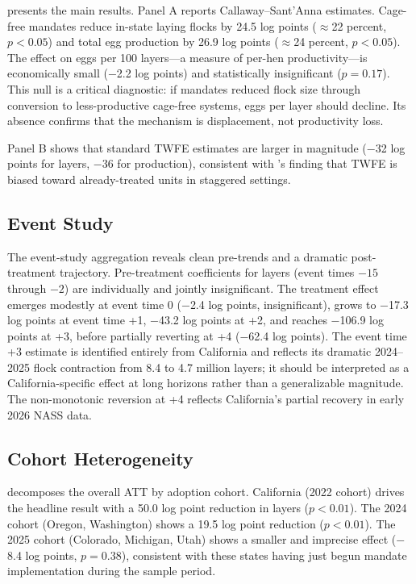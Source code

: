 \documentclass[12pt]{article}
\begin{document}
 presents the main results. Panel A reports Callaway--Sant'Anna estimates. Cage-free mandates reduce in-state laying flocks by 24.5 log points ($\approx$22 percent, $p < 0.05$) and total egg production by 26.9 log points ($\approx$24 percent, $p < 0.05$). The effect on eggs per 100 layers---a measure of per-hen productivity---is economically small ($-$2.2 log points) and statistically insignificant ($p = 0.17$). This null is a critical diagnostic: if mandates reduced flock size through conversion to less-productive cage-free systems, eggs per layer should decline. Its absence confirms that the mechanism is displacement, not productivity loss.

Panel B shows that standard TWFE estimates are larger in magnitude ($-$32 log points for layers, $-$36 for production), consistent with \citet{goodman2021difference}'s finding that TWFE is biased toward already-treated units in staggered settings.



\subsection{Event Study}

The event-study aggregation reveals clean pre-trends and a dramatic post-treatment trajectory. Pre-treatment coefficients for layers (event times $-15$ through $-2$) are individually and jointly insignificant. The treatment effect emerges modestly at event time 0 ($-$2.4 log points, insignificant), grows to $-$17.3 log points at event time +1, $-$43.2 log points at +2, and reaches $-$106.9 log points at +3, before partially reverting at +4 ($-$62.4 log points). The event time +3 estimate is identified entirely from California and reflects its dramatic 2024--2025 flock contraction from 8.4 to 4.7 million layers; it should be interpreted as a California-specific effect at long horizons rather than a generalizable magnitude. The non-monotonic reversion at +4 reflects California's partial recovery in early 2026 NASS data.

\subsection{Cohort Heterogeneity}

 decomposes the overall ATT by adoption cohort. California (2022 cohort) drives the headline result with a 50.0 log point reduction in layers ($p < 0.01$). The 2024 cohort (Oregon, Washington) shows a 19.5 log point reduction ($p < 0.01$). The 2025 cohort (Colorado, Michigan, Utah) shows a smaller and imprecise effect ($-$8.4 log points, $p = 0.38$), consistent with these states having just begun mandate implementation during the sample period.
\end{document}
